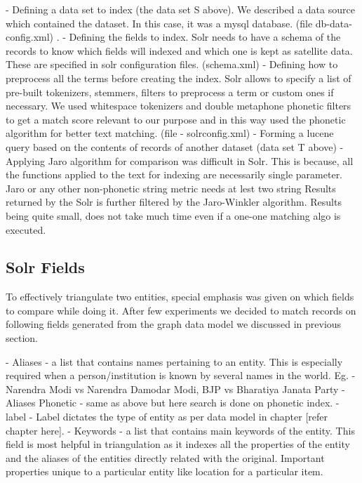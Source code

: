         - Defining a data set to index  (the data set S above). We described a data source which contained the dataset. In this case, it was a mysql database. (file db-data-config.xml) .
        - Defining the fields to index. Solr needs to have a schema of the records to know which fields will indexed and which one is kept as satellite data. These are specified in solr configuration files. (schema.xml)
        - Defining how to preprocess all the terms before creating the index. Solr allows to specify a list of pre-built tokenizers, stemmers, filters to preprocess a term or custom ones if necessary. We used whitespace tokenizers and double metaphone phonetic filters to get a match score relevant to our purpose and in this way used the phonetic algorithm for better text matching. (file - solrconfig.xml)
        - Forming a lucene query based on the contents of records of another dataset (data set T above)
        - Applying Jaro algorithm for comparison was difficult in Solr. This is because, all the functions applied to the text for indexing are necessarily single parameter. Jaro or any other non-phonetic string metric needs at lest two string Results returned by the Solr is further filtered by the Jaro-Winkler algorithm. Results being quite small, does not take much time even if a one-one matching algo is executed. 

\subsection{Solr Fields}
    To effectively triangulate two entities, special emphasis was given on which fields to compare while doing it. After few experiments we decided to match records on following fields generated from the graph data model we discussed in previous section.

    - Aliases - a list that contains names pertaining to an entity. This is especially required when a person/institution is known by several names in the world. Eg. - Narendra Modi vs Narendra Damodar Modi, BJP vs Bharatiya Janata Party 
    - Aliases Phonetic - same as above but here search is done on phonetic index.
    - label - Label dictates the type of entity as per data model in chapter [refer chapter here].
    - Keywords - a list that contains main keywords of the entity. This field is most helpful in triangulation as it indexes all the properties of the entity and the aliases of the entities directly related with the original. Important properties unique to a particular entity like location for a particular item.

